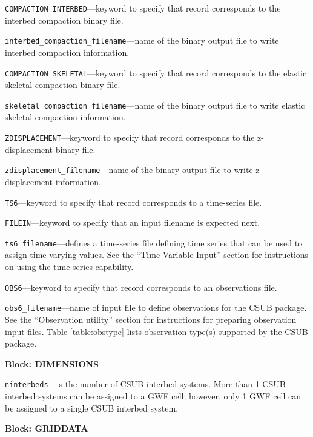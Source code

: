 \begin{description}
\item \texttt{COMPACTION\_INTERBED}---keyword to specify that record corresponds to the interbed compaction binary file.

\item \texttt{interbed\_compaction\_filename}---name of the binary output file to write interbed compaction information.

\item \texttt{COMPACTION\_SKELETAL}---keyword to specify that record corresponds to the elastic skeletal compaction binary file.

\item \texttt{skeletal\_compaction\_filename}---name of the binary output file to write elastic skeletal compaction information.

\item \texttt{ZDISPLACEMENT}---keyword to specify that record corresponds to the z-displacement binary file.

\item \texttt{zdisplacement\_filename}---name of the binary output file to write z-displacement information.

\item \texttt{TS6}---keyword to specify that record corresponds to a time-series file.

\item \texttt{FILEIN}---keyword to specify that an input filename is expected next.

\item \texttt{ts6\_filename}---defines a time-series file defining time series that can be used to assign time-varying values. See the ``Time-Variable Input'' section for instructions on using the time-series capability.

\item \texttt{OBS6}---keyword to specify that record corresponds to an observations file.

\item \texttt{obs6\_filename}---name of input file to define observations for the CSUB package. See the ``Observation utility'' section for instructions for preparing observation input files. Table \ref{table:obstype} lists observation type(s) supported by the CSUB package.

\end{description}
\item \textbf{Block: DIMENSIONS}

\begin{description}
\item \texttt{ninterbeds}---is the number of CSUB interbed systems.  More than 1 CSUB interbed systems can be assigned to a GWF cell; however, only 1 GWF cell can be assigned to a single CSUB interbed system.

\end{description}
\item \textbf{Block: GRIDDATA}

